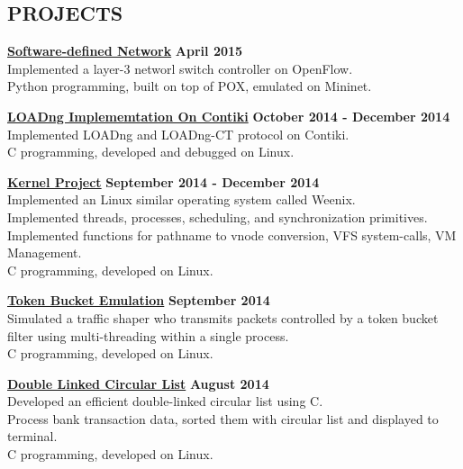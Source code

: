 \documentclass[margin,line]{resume}
\begin{document}
\begin{resume}
\sectionline

    \section{\mysidestyle \textbf{\large{P}\small{ROJECTS}}}

    \textbf{\listing \href{https://github.com/bmyfish/OpenFlow_L3_Learning_Switch}{Software-defined Network}} \hfill \textbf{April 2015}\vspace{2mm}\\
    Implemented a layer-3 networl switch controller on OpenFlow.\\
    Python programming, built on top of POX, emulated on Mininet.     

    \textbf{\listing \href{https://github.com/bmyfish/LOADng-In-Contiki}{LOADng Implememtation On Contiki}} \hfill \textbf{October 2014 - December 2014}\vspace{1mm}\\
    Implemented LOADng and LOADng-CT protocol on Contiki.\\
    C programming, developed and debugged on Linux.  

    \textbf{\listing \href{https://github.com/bmyfish/Weenix}{Kernel Project}} \hfill \textbf{September 2014 - December 2014}\vspace{2mm}\\
    Implemented an Linux similar operating system called Weenix.\\
	Implemented threads, processes, scheduling, and synchronization primitives.\\
	Implemented functions for pathname to vnode conversion, VFS system-calls, VM Management.\\
	C programming, developed on Linux. 

    \textbf{\listing \href{https://github.com/bmyfish/Token_Bucket_Emulation}{Token Bucket Emulation}} \hfill \textbf{September 2014}\vspace{2mm}\\
    Simulated a traffic shaper who transmits packets controlled by a token bucket filter using multi-threading within a single process.\\
    C programming, developed on Linux.    

    \textbf{\listing \href{https://github.com/bmyfish/Double_Linked_Circular_List}{Double Linked Circular List}} \hfill \textbf{August 2014}\vspace{2mm}\\
    Developed an efficient double-linked circular list using C.\\
    Process bank transaction data, sorted them with circular list and displayed to terminal.\\
    C programming, developed on Linux.


\end{resume}
\end{document}
